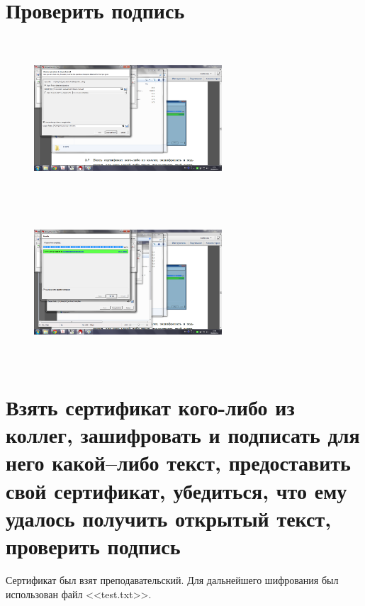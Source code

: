 \documentclass[utf8x, 12pt]{G7-32}
\begin{document}
 \newpage
\section{Проверить подпись}
\begin{figure}[hhh!]
	\begin{center}
		\includegraphics[width=7cm, height=6cm]{img2/261}
		\includegraphics[width=7cm, height=6cm]{img2/262}
	\end{center}
\end{figure}	


\section{Взять сертификат кого-либо из коллег, зашифровать и подписать для него какой--либо текст, предоставить свой сертификат, убедиться, что ему удалось получить открытый текст, проверить подпись}

Сертификат был взят преподавательский. Для дальнейшего шифрования был использован файл <<test.txt>>.
\end{document}
